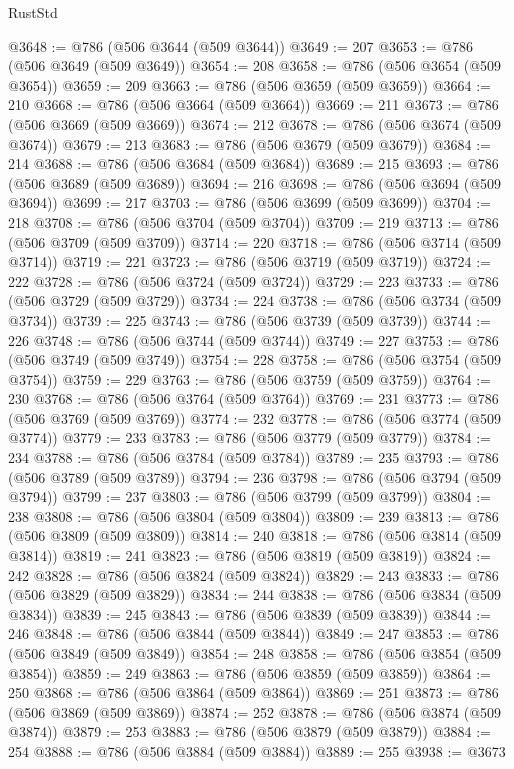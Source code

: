 \begin{lexlean}{RustStd}
\begin{coremodule}
{\begin{coremodule}
{{{{{{{{{{{{{{{{{{{{{{{{{{{{{{{{{{{{{{{{{{{{{{{{{{{{{{{@3648 := @786 (@506 @3644 (@509 @3644))
@3649 := 207
@3653 := @786 (@506 @3649 (@509 @3649))
@3654 := 208
@3658 := @786 (@506 @3654 (@509 @3654))
@3659 := 209
@3663 := @786 (@506 @3659 (@509 @3659))
@3664 := 210
@3668 := @786 (@506 @3664 (@509 @3664))
@3669 := 211
@3673 := @786 (@506 @3669 (@509 @3669))
@3674 := 212
@3678 := @786 (@506 @3674 (@509 @3674))
@3679 := 213
@3683 := @786 (@506 @3679 (@509 @3679))
@3684 := 214
@3688 := @786 (@506 @3684 (@509 @3684))
@3689 := 215
@3693 := @786 (@506 @3689 (@509 @3689))
@3694 := 216
@3698 := @786 (@506 @3694 (@509 @3694))
@3699 := 217
@3703 := @786 (@506 @3699 (@509 @3699))
@3704 := 218
@3708 := @786 (@506 @3704 (@509 @3704))
@3709 := 219
@3713 := @786 (@506 @3709 (@509 @3709))
@3714 := 220
@3718 := @786 (@506 @3714 (@509 @3714))
@3719 := 221
@3723 := @786 (@506 @3719 (@509 @3719))
@3724 := 222
@3728 := @786 (@506 @3724 (@509 @3724))
@3729 := 223
@3733 := @786 (@506 @3729 (@509 @3729))
@3734 := 224
@3738 := @786 (@506 @3734 (@509 @3734))
@3739 := 225
@3743 := @786 (@506 @3739 (@509 @3739))
@3744 := 226
@3748 := @786 (@506 @3744 (@509 @3744))
@3749 := 227
@3753 := @786 (@506 @3749 (@509 @3749))
@3754 := 228
@3758 := @786 (@506 @3754 (@509 @3754))
@3759 := 229
@3763 := @786 (@506 @3759 (@509 @3759))
@3764 := 230
@3768 := @786 (@506 @3764 (@509 @3764))
@3769 := 231
@3773 := @786 (@506 @3769 (@509 @3769))
@3774 := 232
@3778 := @786 (@506 @3774 (@509 @3774))
@3779 := 233
@3783 := @786 (@506 @3779 (@509 @3779))
@3784 := 234
@3788 := @786 (@506 @3784 (@509 @3784))
@3789 := 235
@3793 := @786 (@506 @3789 (@509 @3789))
@3794 := 236
@3798 := @786 (@506 @3794 (@509 @3794))
@3799 := 237
@3803 := @786 (@506 @3799 (@509 @3799))
@3804 := 238
@3808 := @786 (@506 @3804 (@509 @3804))
@3809 := 239
@3813 := @786 (@506 @3809 (@509 @3809))
@3814 := 240
@3818 := @786 (@506 @3814 (@509 @3814))
@3819 := 241
@3823 := @786 (@506 @3819 (@509 @3819))
@3824 := 242
@3828 := @786 (@506 @3824 (@509 @3824))
@3829 := 243
@3833 := @786 (@506 @3829 (@509 @3829))
@3834 := 244
@3838 := @786 (@506 @3834 (@509 @3834))
@3839 := 245
@3843 := @786 (@506 @3839 (@509 @3839))
@3844 := 246
@3848 := @786 (@506 @3844 (@509 @3844))
@3849 := 247
@3853 := @786 (@506 @3849 (@509 @3849))
@3854 := 248
@3858 := @786 (@506 @3854 (@509 @3854))
@3859 := 249
@3863 := @786 (@506 @3859 (@509 @3859))
@3864 := 250
@3868 := @786 (@506 @3864 (@509 @3864))
@3869 := 251
@3873 := @786 (@506 @3869 (@509 @3869))
@3874 := 252
@3878 := @786 (@506 @3874 (@509 @3874))
@3879 := 253
@3883 := @786 (@506 @3879 (@509 @3879))
@3884 := 254
@3888 := @786 (@506 @3884 (@509 @3884))
@3889 := 255
@3938 := @3673
}}}}}}}}}}}}}}}}}}}}}}}}}}}}}}}}}}}}}}}}}}}}}}}}}}}}}}}
\end{coremodule}}
\end{coremodule}
\end{lexlean}
